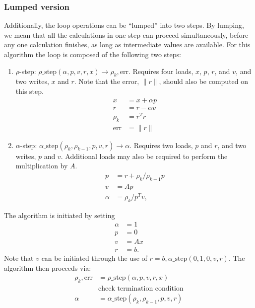 \documentclass{article}
\begin{document}
\subsubsection{Lumped version}
Additionally, the loop operations can be ``lumped'' into two steps.
By lumping, we mean that all the calculations in one step can proceed
    simultaneously, before any one calculation finishes,
    as long as intermediate values are available.
For this algorithm the loop is composed of the following two steps:
\begin{enumerate}
\item $\rho$-step: $\rho\_\text{step}(\alpha, p, v, r, x) 
                    \rightarrow \rho_k, \text{err} $.
    Requires four loads, $x$, $p$, $r$, and $v$, and two writes, $x$ and $r$.
    Note that the error, $\|r\|$, should also be computed on this step.
    \begin{subequations}\begin{align}
    x &= x + \alpha p \\
    r &= r - \alpha v \\
    \rho_k &= r^T r \\
    \text{err} &= \|r\| 
    \end{align}\end{subequations}
\item $\alpha$-step: $\alpha\_\text{step}(\rho_k, \rho_{k-1}, p, v, r) 
                        \rightarrow \alpha$.
    Requires two loads, $p$ and $r$, and two writes, $p$ and $v$. 
    Additional loads may also be required to perform the multiplication by $A$.
    \begin{subequations}\begin{align}
    p &= r + \rho_k / \rho_{k-1} p \\
    v &= A p \\
    \alpha &= \rho_k / p^T v,
    \end{align}\end{subequations}
\end{enumerate}

The algorithm is initiated by setting
    \begin{subequations}\begin{align}
    \alpha &= 1 \\
    p &= 0 \\
    v &= Ax \\
    r &= b.
    \end{align}\end{subequations}
Note that $v$ can be initiated through the use of 
    $r =b, \alpha\_\text{step}(0, 1, 0, v, r)$.
The algorithm then proceeds via:
    \begin{subequations}\begin{align}
    \rho_k, \text{err} &= \rho\_\text{step}(\alpha, p, v, r, x) \\
    & \text{check termination condition} \\
    \alpha &= \alpha\_\text{step}(\rho_k, \rho_{k-1}, p, v, r) 
    \end{align}\end{subequations}
\end{document}
